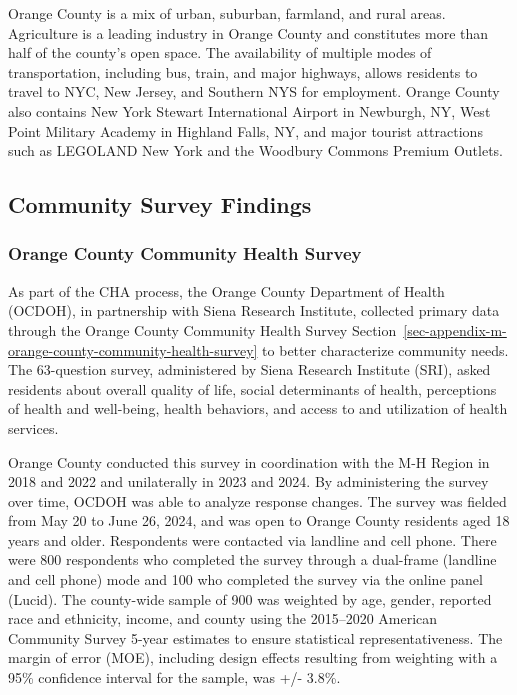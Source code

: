 \documentclass[
  english,
  letterpaper,
]{report}
\begin{document}
Orange County is a mix of urban, suburban, farmland, and rural areas.
Agriculture is a leading industry in Orange County and constitutes more
than half of the county's open space. The availability of multiple modes
of transportation, including bus, train, and major highways, allows
residents to travel to NYC, New Jersey, and Southern NYS for employment.
Orange County also contains New York Stewart International Airport in
Newburgh, NY, West Point Military Academy in Highland Falls, NY, and
major tourist attractions such as LEGOLAND New York and the Woodbury
Commons Premium Outlets.

\subsection{Community Survey
Findings}\label{community-survey-findings-1}

\subsubsection{Orange County Community Health
Survey}\label{orange-county-community-health-survey}

As part of the CHA process, the Orange County Department of Health
(OCDOH), in partnership with Siena Research Institute, collected primary
data through the Orange County Community Health Survey
Section~\ref{sec-appendix-m-orange-county-community-health-survey} to
better characterize community needs. The 63-question survey,
administered by Siena Research Institute (SRI), asked residents about
overall quality of life, social determinants of health, perceptions of
health and well-being, health behaviors, and access to and utilization
of health services.

Orange County conducted this survey in coordination with the M-H Region
in 2018 and 2022 and unilaterally in 2023 and 2024. By administering the
survey over time, OCDOH was able to analyze response changes. The survey
was fielded from May 20 to June 26, 2024, and was open to Orange County
residents aged 18 years and older. Respondents were contacted via
landline and cell phone. There were 800 respondents who completed the
survey through a dual-frame (landline and cell phone) mode and 100 who
completed the survey via the online panel (Lucid). The county-wide
sample of 900 was weighted by age, gender, reported race and ethnicity,
income, and county using the 2015--2020 American Community Survey 5-year
estimates to ensure statistical representativeness. The margin of error
(MOE), including design effects resulting from weighting with a 95\%
confidence interval for the sample, was +/- 3.8\%.
\end{document}
